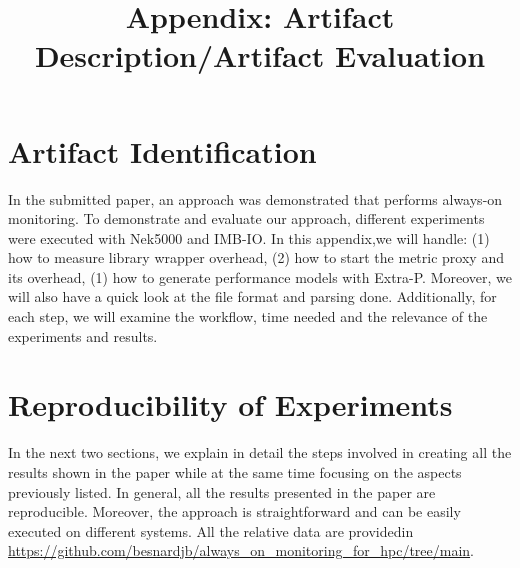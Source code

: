 \documentclass[sigconf,nonacm=true]{acmart}
\title[On Enabling Continuous Optimization for HPC Workloads]{Appendix: Artifact Description/Artifact Evaluation}
\begin{document}
\acmPrice{}
\acmDOI{}
\acmISBN{}

\sloppy
\maketitle


\renewcommand{\shortauthors}{ JB. Besnard and A. Tarraf }

\section*{Artifact Identification}
In the submitted paper, an approach was demonstrated that performs always-on monitoring. To demonstrate and evaluate our approach, 
different experiments were executed with Nek5000 and IMB-IO. In this appendix,we will 
handle: 
(1) how to measure library wrapper overhead,
(2) how to start the metric proxy and its overhead, 
(1) how to generate performance models with Extra-P. 
Moreover, we will also have a quick look at the file format and parsing done. 
Additionally, for each step, we will examine the workflow, time needed and the relevance 
of the experiments and results.

\section*{Reproducibility of Experiments}
In the next two sections, we explain in detail the steps involved in creating all the results shown in the paper while 
at the same time focusing on the aspects previously listed. In general, all 
the results presented in the paper are reproducible. Moreover, 
the approach is straightforward and can be easily executed 
on different systems. All the relative data are providedin \url{https://github.com/besnardjb/always\_on\_monitoring\_for\_hpc/tree/main}.







\end{document}
